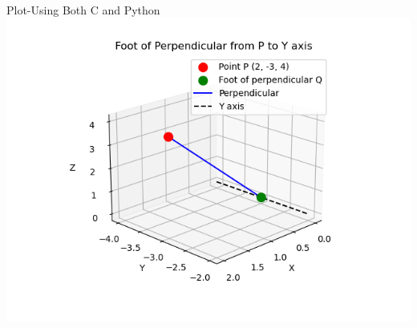 \documentclass{beamer}
\numberwithin{equation}{section}
\begin{document}
\begin{frame}{Plot-Using Both C and Python}
    \centering
    \includegraphics[width=\columnwidth, height=0.8\textheight, keepaspectratio]{FIG/fig2.png}     
\end{frame}
\end{document}
